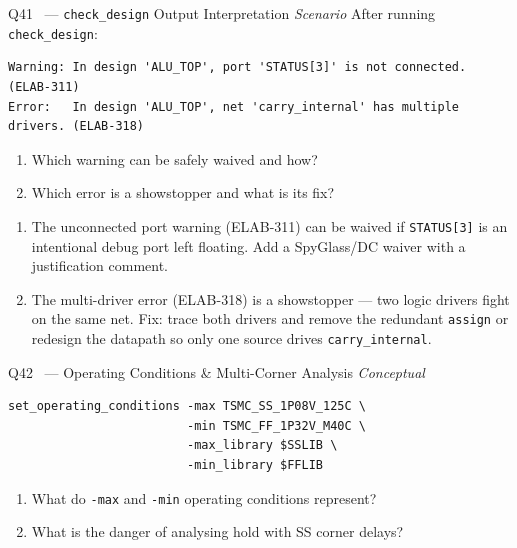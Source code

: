 \documentclass[12pt,a4paper]{article}
\newcommand{\advanced}{%
  \fbox{\textcolor{advred}{\bfseries\sffamily\small ADVANCED}}}
\newcommand{\moderate}{%
  \fbox{\textcolor{modoran}{\bfseries\sffamily\small MODERATE}}}
\begin{document}
\begin{questionbox}{Q41 \moderate\ --- \texttt{check\_design} Output Interpretation \hfill\textit{Scenario}}
After running \texttt{check\_design}:
\begin{lstlisting}[style=plaincode]
Warning: In design 'ALU_TOP', port 'STATUS[3]' is not connected. (ELAB-311)
Error:   In design 'ALU_TOP', net 'carry_internal' has multiple drivers. (ELAB-318)
\end{lstlisting}
\begin{enumerate}[label=\textbf{\alph*)}]
  \item Which warning can be safely waived and how?
  \item Which error is a showstopper and what is its fix?
\end{enumerate}
\end{questionbox}

\begin{answerbox}
\begin{enumerate}[label=\textbf{\alph*)}]
  \item The unconnected port warning (ELAB-311) can be waived if \texttt{STATUS[3]} is an intentional debug port left floating. Add a SpyGlass/DC waiver with a justification comment.
  \item The multi-driver error (ELAB-318) is a showstopper --- two logic drivers fight on the same net. Fix: trace both drivers and remove the redundant \texttt{assign} or redesign the datapath so only one source drives \texttt{carry\_internal}.
\end{enumerate}
\end{answerbox}

\begin{questionbox}{Q42 \advanced\ --- Operating Conditions \& Multi-Corner Analysis \hfill\textit{Conceptual}}

\begin{lstlisting}[style=tclstyle]
set_operating_conditions -max TSMC_SS_1P08V_125C \
                         -min TSMC_FF_1P32V_M40C \
                         -max_library $SSLIB \
                         -min_library $FFLIB
\end{lstlisting}

\begin{enumerate}[label=\textbf{\alph*)}]
  \item What do \texttt{-max} and \texttt{-min} operating conditions represent?
  \item What is the danger of analysing hold with SS corner delays?
\end{enumerate}
\end{questionbox}
\end{document}
